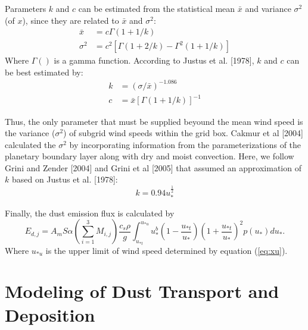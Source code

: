   Parameters $k$ and $c$ can be estimated from the statistical mean $\bar{x}$ and 
  variance $\sigma^2$ (of $x$), since they are related to $\bar{x}$ and $\sigma^2$: 
  \begin{align}
  \bar{x}  &= c \Gamma(1+1/k)  \\
  \sigma^2 &= c^2 \left[ \Gamma(1+2/k) - \Gamma^2(1+1/k) \right]  
  \end{align}
  Where $\Gamma()$ is a gamma function. According to Justus et al. [1978], $k$ and $c$ 
  can be best estimated by:
  \begin{align}
  k &= (\sigma/\bar{x})^{-1.086} \\
  c &= \bar{x} \left[ \Gamma(1+1/k) \right]^{-1}
  \end{align}
  
  Thus, the only parameter that must be supplied beyound the mean wind speed is the 
  variance ($\sigma^2$) of subgrid wind speeds within the grid box. Cakmur et al [2004] 
  calculated the $\sigma^2$ by incorporating information from the parameterizations of 
  the planetary boundary layer along with dry and moist convection. Here, we follow 
  Grini and Zender [2004] and Grini et al [2005] that assumed an approximation of $k$ 
  based on Justus et al. [1978]:
  \begin{equation}
  k = 0.94u_*^{\frac{1}{2}}
  \end{equation}

  Finally, the dust emission flux is calculated by
  \begin{equation} \label{eq:Edp}
  E_{d,j} = A_m S \alpha \left( \displaystyle{\sum_{i=1}^3 M_{i,j}} \right)
          \frac{c_s \rho}{g}
          \displaystyle \int_{u_{*t}}^{u_{*u}} 
          u_*^b\left(1-\frac{u_{*t}}{u_*}\right)
          \left(1+\frac{u_{*t}}{u_*}\right)^2 
          p(u_*) d u_* \mbox{.}
  \end{equation}  
  Where $u_{*u}$ is the upper limit of wind speed determined by equation (\ref{eq:xu}).
  

\section{Modeling of Dust Transport and Deposition}

